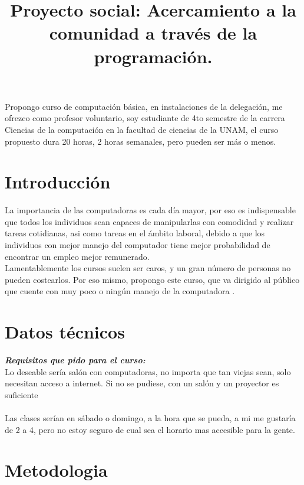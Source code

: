 \documentclass[12pt]{article}
\title{Proyecto social: Acercamiento a la comunidad a través de la programación. }
\author{Alejandro Iabin Arteaga Hernández\\ \href{iabin@ciencias.unam.mx}}
\begin{document}
 

\maketitle

\begin{resumo}
  Propongo curso de computación básica, en instalaciones de la delegación, me ofrezco como profesor voluntario, 
  soy estudiante de 4to semestre de la carrera Ciencias de la computación en la facultad de ciencias de la 
  UNAM, el curso propuesto dura 20 horas, 2 horas semanales, pero pueden ser más o menos.
  
\end{resumo}


\section{Introducción}

La importancia de las computadoras es cada día mayor, por eso es indispensable que todos los individuos sean capaces de manipularlas con comodidad y realizar tareas cotidianas, asi como tareas en el ámbito laboral, debido a que los individuos con mejor manejo del computador tiene mejor probabilidad de encontrar un empleo mejor remunerado.\\     Lamentablemente los cursos suelen ser caros, y un gran número de personas no pueden costearlos. Por eso mismo, propongo este curso, que va dirigido al público que cuente con muy poco o ningún manejo de la computadora   .


\section{Datos técnicos} \label{sec:firstpage}

\textbf{\textit{Requisitos que pido para el curso:}}\\
Lo deseable sería salón con computadoras, no importa que tan viejas sean, solo necesitan acceso a internet. 
    Si no se pudiese, con un salón y un proyector es suficiente \\ \\
    Las clases serían en sábado o domingo, a la hora que se pueda, a mi me gustaría de 2 a 4, pero no estoy seguro de cual sea el horario mas accesible para la gente.

\section{Metodologia}
\end{document}
